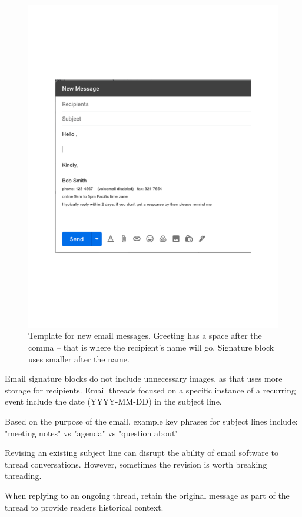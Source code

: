 \begin{figure}
\includegraphics[width=1\textwidth]{images/email_template.pdf}
\caption{Template for new email messages. Greeting has a space after the comma -- that is where the recipient's name will go. Signature block uses smaller after the name.}
\label{fig:email_template}
\end{figure}

Email signature blocks do not include unnecessary images, as that uses more storage for recipients. 
Email threads focused on a specific instance of a recurring event include the date (YYYY-MM-DD) in the subject line. 

Based on the purpose of the email, example key phrases for subject lines include: "meeting notes" vs "agenda" vs "question about"

Revising an existing subject line can disrupt the ability of email software to thread conversations. However, sometimes the revision is worth breaking threading.

When replying to an ongoing thread, retain the original message as part of the thread to provide readers historical context.

